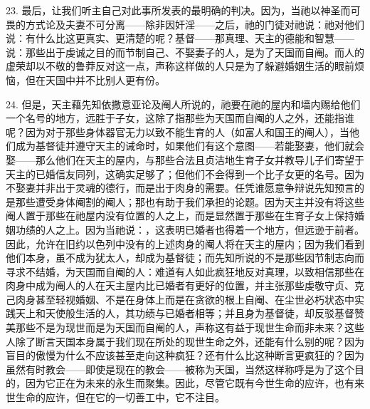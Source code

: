 23. 最后，让我们听主自己对此事所发表的最明确的判决。因为，当祂以神圣而可畏的方式论及夫妻不可分离——除非因奸淫——之后，祂的门徒对祂说：祂对他们说：有什么比这更真实、更清楚的呢？基督——那真理、天主的德能和智慧——说：那些出于虔诚之目的而节制自己、不娶妻子的人，是为了天国而自阉。而人的虚荣却以不敬的鲁莽反对这一点，声称这样做的人只是为了躲避婚姻生活的眼前烦恼，但在天国中并不比别人更有份。\par

24. 但是，天主藉先知依撒意亚论及阉人所说的，祂要在祂的屋内和墙内赐给他们一个名号的地方，远胜于子女，这除了指那些为天国而自阉的人之外，还能指谁呢？因为对于那些身体器官无力以致不能生育的人（如富人和国王的阉人），当他们成为基督徒并遵守天主的诫命时，如果他们有这个意图——若能娶妻，他们就会娶——那么他们在天主的屋内，与那些合法且贞洁地生育子女并教导儿子们寄望于天主的已婚信友同列，这确实足够了；但他们不会得到一个比子女更的名号。因为不娶妻并非出于灵魂的德行，而是出于肉身的需要。任凭谁愿意争辩说先知预言的是那些遭受身体阉割的阉人；那也有助于我们承担的论题。因为天主并没有将这些阉人置于那些在祂屋内没有位置的人之上，而是显然置于那些在生育子女上保持婚姻功绩的人之上。因为当祂说：，这表明已婚者也得着一个地方，但远逊于前者。因此，允许在旧约以色列中没有的上述肉身的阉人将在天主的屋内；因为我们看到他们本身，虽不成为犹太人，却成为基督徒；而先知所说的不是那些因节制志向而寻求不结婚，为天国而自阉的人：难道有人如此疯狂地反对真理，以致相信那些在肉身中成为阉人的人在天主屋内比已婚者有更好的位置，并主张那些虔敬守贞、克己肉身甚至轻视婚姻、不是在身体上而是在贪欲的根上自阉、在尘世必朽状态中实践天上和天使般生活的人，其功绩与已婚者相等；并且身为基督徒，却反驳基督赞美那些不是为现世而是为天国而自阉的人，声称这有益于现世生命而非未来？这些人除了断言天国本身属于我们现在所处的现世生命之外，还能有什么别的呢？因为盲目的傲慢为什么不应该甚至走向这种疯狂？还有什么比这种断言更疯狂的？因为虽然有时教会——即使是现在的教会——被称为天国，当然这样称呼是为了这个目的，因为它正在为未来的永生而聚集。因此，尽管它既有今世生命的应许，也有来世生命的应许，但在它的一切善工中，它不注目。\newline{}\par

